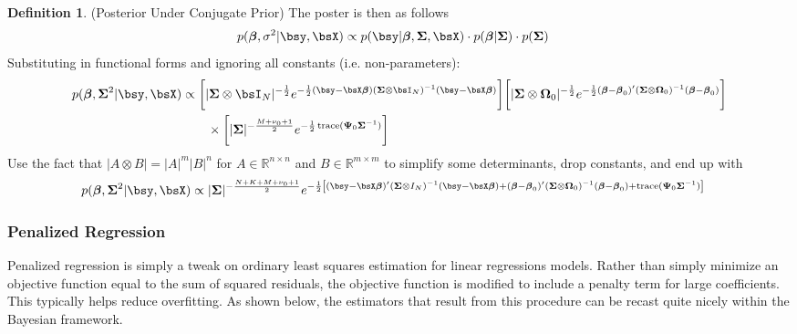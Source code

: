\documentclass[12pt]{article}
\theoremstyle{plain}
\theoremstyle{definition}
\newtheorem{defn}[thm]{Definition}
\theoremstyle{remark}
\newcommand{\bsSigma}{\boldsymbol{\Sigma}}
\newcommand{\bsbeta}{\boldsymbol{\beta}}
\newcommand{\bsOmega}{\boldsymbol{\Omega}}
\newcommand{\bsPsi}{\boldsymbol{\Psi}}
\newcommand{\Rnn}{\mathbb{R}^{n\times n}}
\newcommand{\Rmm}{\mathbb{R}^{m\times m}}
\newcommand{\trace}{\operatorname{trace}}
\begin{document}
\begin{defn}(Posterior Under Conjugate Prior)
The poster is then as follows
\begin{align*}
   p(\bsbeta, \sigma^2 | \bsy,\bsX)
   &\propto
   p(\bsy|\bsbeta,\bsSigma,\bsX)\cdot p(\bsbeta|\bsSigma)\cdot p(\bsSigma)
\end{align*}
Substituting in functional forms and ignoring all constants (i.e.
non-parameters):
\begin{align*}
  p(\bsbeta, \bsSigma^2 | \bsy,\bsX)
  &\propto
  \bigg[
  |\bsSigma\otimes \bsI_N|^{-\frac{1}{2}}
  e^{-\frac{1}{2}(\bsy-\bsX\bsbeta)(\bsSigma\otimes\bsI_N)^{-1}(\bsy-\bsX\bsbeta)}
  \bigg]
  \bigg[
  |\bsSigma\otimes\bsOmega_0|^{-\frac{1}{2}}
  e^{-\frac{1}{2}(\bsbeta-\bsbeta_0)'(\bsSigma\otimes\bsOmega_0)^{-1}(\bsbeta-\bsbeta_0)}
  \bigg]
  \\
  &\qquad
  \times
  \bigg[
  |\bsSigma|^{-\frac{M+\nu_0+1}{2}}
  e^{-\frac{1}{2}\trace(\bsPsi_0\bsSigma^{-1})}
  \bigg]
\end{align*}
Use the fact that $|A\otimes B|=|A|^m|B|^n$ for $A\in\Rnn$ and
$B\in\Rmm$ to simplify some determinants, drop constants, and end up
with
\begin{align*}
  p(\bsbeta, \bsSigma^2 | \bsy,\bsX)
  &\propto
  |\bsSigma|^{-\frac{N+K+M+\nu_0+1}{2}}
  e^{%
    -\frac{1}{2}
    \left[
    (\bsy-\bsX\bsbeta)'(\bsSigma\otimes I_N)^{-1}(\bsy-\bsX\bsbeta)
    + (\bsbeta-\bsbeta_0)'(\bsSigma\otimes\bsOmega_0)^{-1}(\bsbeta-\bsbeta_0)
    + \trace(\bsPsi_0\bsSigma^{-1})
    \right]
  }
\end{align*}
\end{defn}


\clearpage
\subsubsection{Penalized Regression}

Penalized regression is simply a tweak on ordinary least squares
estimation for linear regressions models.
Rather than simply minimize an objective function equal to the sum of
squared residuals, the objective function is modified to include a
penalty term for large coefficients.
This typically helps reduce overfitting.
As shown below, the estimators that result from this procedure can be
recast quite nicely within the Bayesian framework.
\end{document}

